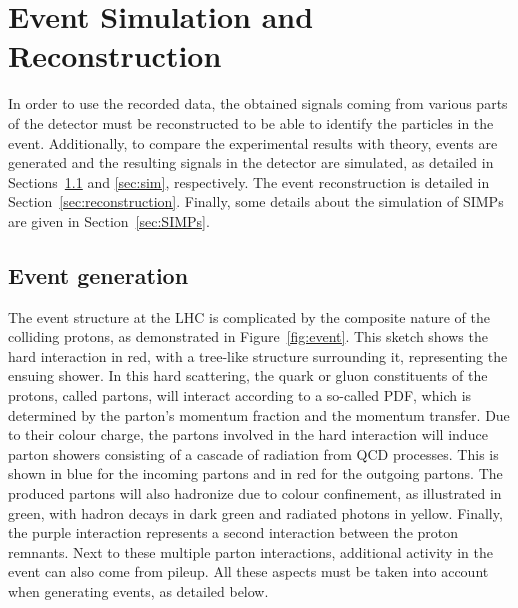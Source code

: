 \graphicspath{{chapt_dutch/}{intro/}{detector/}{reconstruction/}}

\renewcommand\evenpagerightmark{{\scshape\small Chapter 4}}
\renewcommand\oddpageleftmark{{\scshape\small Event Simulation and Reconstruction}}

\hyphenation{}

\chapter{Event Simulation and Reconstruction}
\label{ch:reconstruction}

In order to use the recorded data, the obtained signals coming from various parts of the detector must be reconstructed to be able to identify the particles in the event. Additionally, to compare the experimental results with theory, events are generated and the resulting signals in the detector are simulated, as detailed in Sections~\ref{sec:generation} and \ref{sec:sim}, respectively. The event reconstruction is detailed in Section~\ref{sec:reconstruction}. Finally, some details about the simulation of \acp{SIMP} are given in Section~\ref{sec:SIMPs}.

\section{Event generation}
\label{sec:generation}


The event structure at the \ac{LHC} is complicated by the composite nature of the colliding protons, as demonstrated in Figure~\ref{fig:event}. This sketch shows the hard interaction in red, with a tree-like structure surrounding it, representing the ensuing shower. In this hard scattering, the quark or gluon constituents of the protons, called partons, will interact according to a so-called \ac{PDF}, which is determined by the parton's momentum fraction and the momentum transfer. Due to their colour charge, the partons involved in the hard interaction will induce parton showers consisting of a cascade of radiation from \acs{QCD} processes. This is shown in blue for the incoming partons and in red for the outgoing partons. The produced partons will also hadronize due to colour confinement, as illustrated in green, with hadron decays in dark green and radiated photons in yellow. Finally, the purple interaction represents a second interaction between the proton remnants. Next to these multiple parton interactions, additional activity in the event can also come from pileup. All these aspects must be taken into account when generating events, as detailed below.

